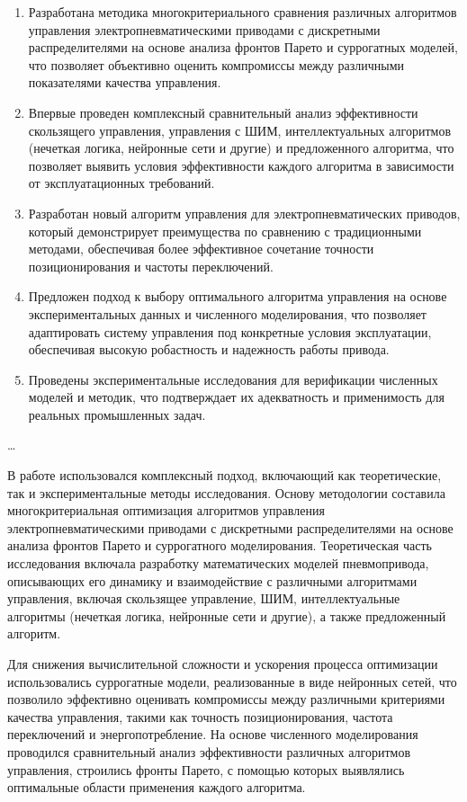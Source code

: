 {\novelty}
\begin{enumerate}[beginpenalty=10000] %
    \item Разработана методика многокритериального сравнения различных алгоритмов управления электропневматическими
    приводами с дискретными распределителями на основе анализа фронтов Парето и суррогатных
    моделей, что позволяет объективно оценить компромиссы между
    различными показателями качества управления.
    \item Впервые проведен комплексный сравнительный анализ эффективности
    скользящего управления, управления с ШИМ, интеллектуальных алгоритмов (нечеткая логика, нейронные сети и другие)
    и предложенного алгоритма, что позволяет выявить условия эффективности каждого
    алгоритма в зависимости от эксплуатационных требований.
    \item Разработан новый алгоритм управления для электропневматических приводов, который демонстрирует
    преимущества по сравнению с традиционными методами, обеспечивая более эффективное
    сочетание точности позиционирования и частоты переключений.
    \item Предложен подход к выбору оптимального алгоритма управления на основе
    экспериментальных данных и численного моделирования, что позволяет адаптировать
    систему управления под конкретные условия эксплуатации, обеспечивая
    высокую робастность и надежность работы привода.
    \item Проведены экспериментальные исследования для верификации численных моделей и методик,
    что подтверждает их адекватность и применимость для реальных промышленных задач.
\end{enumerate}

{\influence} \ldots

{\methods} В работе использовался комплексный подход, включающий как теоретические, так и
экспериментальные методы исследования. Основу методологии составила многокритериальная оптимизация
алгоритмов управления электропневматическими приводами с дискретными распределителями на основе анализа
фронтов Парето и суррогатного моделирования. Теоретическая часть исследования включала разработку математических
моделей пневмопривода, описывающих его динамику и взаимодействие с различными алгоритмами управления, включая скользящее
управление, ШИМ, интеллектуальные алгоритмы (нечеткая логика, нейронные сети и другие), а также предложенный алгоритм.

Для снижения вычислительной сложности и ускорения процесса оптимизации использовались суррогатные модели, реализованные
в виде нейронных сетей, что позволило эффективно оценивать компромиссы между различными критериями качества управления,
такими как точность позиционирования, частота переключений и энергопотребление. На основе численного моделирования проводился
сравнительный анализ эффективности различных алгоритмов управления, строились фронты Парето, с помощью которых выявлялись
оптимальные области применения каждого алгоритма.


